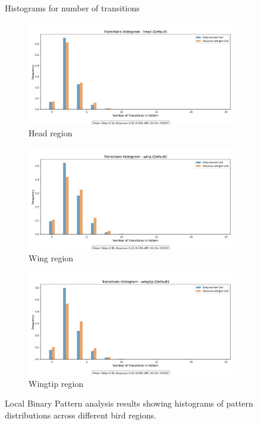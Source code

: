 \documentclass[a4paper,12pt]{report}
\begin{document}
\begin{figure}[H]
    \caption{Histograms for number of transitions}
    \centering
    \begin{subfigure}[b]{0.32\textwidth}
        \includegraphics[width=\textwidth]{images/appendix/Transitions_Analysis/default_head_transitions_histogram.png}
        \caption{Head region}
        \label{fig:lbp_head}
    \end{subfigure}
    \hfill
    \begin{subfigure}[b]{0.32\textwidth}
        \includegraphics[width=\textwidth]{images/appendix/Transitions_Analysis/default_wing_transitions_histogram.png}
        \caption{Wing region}
        \label{fig:lbp_wing}
    \end{subfigure}
    \hfill
    \begin{subfigure}[b]{0.32\textwidth}
        \includegraphics[width=\textwidth]{images/appendix/Transitions_Analysis/default_wingtip_transitions_histogram.png}
        \caption{Wingtip region}
        \label{fig:lbp_wingtip}
    \end{subfigure}
    \caption{Local Binary Pattern analysis results showing histograms of pattern distributions across different bird regions.}
    \label{fig:lbp_results}
\end{figure}
\end{document}

